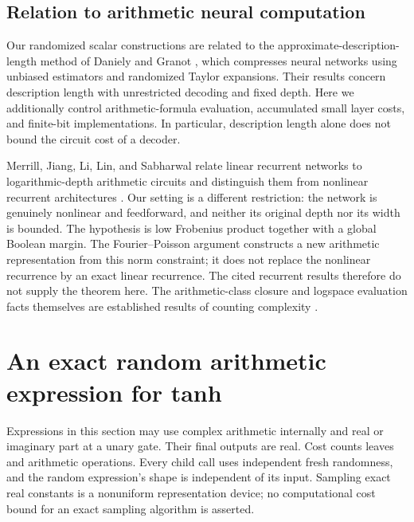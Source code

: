 \documentclass[11pt]{article}
\theoremstyle{remark}\newtheorem{remark}[theorem]{Remark}
\begin{document}
\subsection{Relation to arithmetic neural computation}

Our randomized scalar constructions are related to the
approximate-description-length method of Daniely and Granot
\cite{danielygranot}, which compresses neural networks using unbiased
estimators and randomized Taylor expansions. Their results concern
description length with unrestricted decoding and fixed depth. Here
we additionally control arithmetic-formula evaluation, accumulated
small layer costs, and finite-bit implementations. In particular,
description length alone does not bound the circuit cost of a decoder.

Merrill, Jiang, Li, Lin, and Sabharwal relate linear recurrent networks
to logarithmic-depth arithmetic circuits and distinguish them from
nonlinear recurrent architectures \cite{merrill}. Our setting is a
different restriction: the network is genuinely nonlinear and
feedforward, and neither its original depth nor its width is bounded.
The hypothesis is low Frobenius product together with a global Boolean
margin. The Fourier--Poisson argument constructs a new arithmetic
representation from this norm constraint; it does not replace the
nonlinear recurrence by an exact linear recurrence. The cited recurrent
results therefore do not supply the theorem here. The arithmetic-class
closure and logspace evaluation facts themselves are established
results of counting complexity \cite{datta,caussinus}.

\section{An exact random arithmetic expression for tanh}
\label{sec:estimator}

Expressions in this section may use complex arithmetic internally and
real or imaginary part at a unary gate. Their final outputs are real.
Cost counts leaves and arithmetic operations. Every child call uses
independent fresh randomness, and the random expression's shape is
independent of its input. Sampling exact real constants is a
nonuniform representation device; no computational cost bound for an
exact sampling algorithm is asserted.
\end{document}
